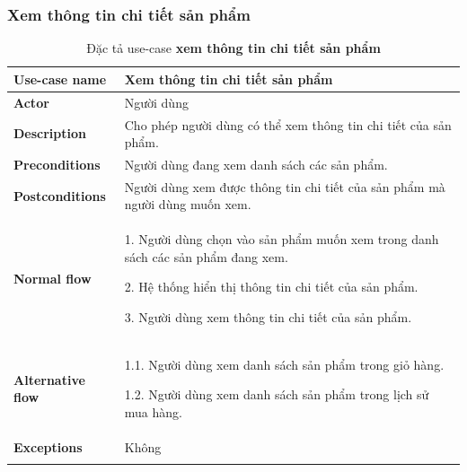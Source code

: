 \subsubsection{Xem thông tin chi tiết sản phẩm }
{
    \setlength\extrarowheight{6pt}
    \begin{longtable}{| p{} | p{} |}
        \hline
        \textbf{Use-case name}
         &
        Xem thông tin chi tiết sản phẩm
        \\
        \hline
        \textbf{Actor}
         &
        Người dùng
        \\
        \hline
        \textbf{Description}
         &
        Cho phép người dùng có thể xem thông tin chi tiết của sản phẩm.
        \\
        \hline
        \textbf{Preconditions}
         &
        Người dùng đang xem danh sách các sản phẩm.
        \\
        \hline
        \textbf{Postconditions}
         &
        Người dùng xem được thông tin chi tiết của sản phẩm mà người dùng muốn xem.
        \\
        \hline
        \begin{flushleft}
            \textbf{Normal flow}
        \end{flushleft}
         &
        1. Người dùng chọn vào sản phẩm muốn xem trong danh sách các sản phẩm đang xem.

        2. Hệ thống hiển thị thông tin chi tiết của sản phẩm.

        3. Người dùng xem thông tin chi tiết của sản phẩm.
        \\
        \hline
        \textbf{Alternative flow}
         &
        1.1. Người dùng xem danh sách sản phẩm trong giỏ hàng.

        1.2. Người dùng xem danh sách sản phẩm trong lịch sử mua hàng.
        \\
        \hline
        \textbf{Exceptions}
         &
        Không
        \\
        \hline
        \caption{Đặc tả use-case \textbf{xem thông tin chi tiết sản phẩm}}
    \end{longtable}
}


